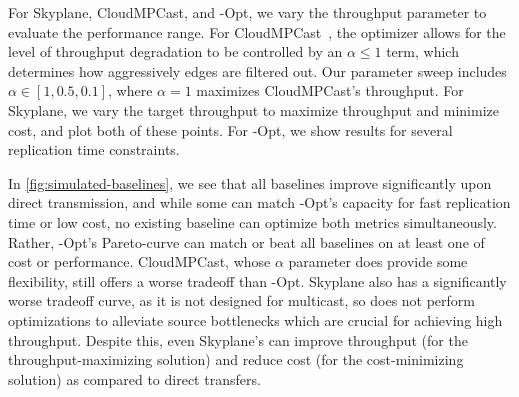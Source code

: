 For Skyplane, CloudMPCast, and \sys-Opt, we vary the throughput parameter to evaluate the performance range.  
For CloudMPCast~\cite{garcia2015cost}, the optimizer 
allows for the level of throughput degradation to be controlled by an $\alpha \le 1$ term, which determines how aggressively edges are filtered out.
Our parameter sweep includes $\alpha \in [1, 0.5, 0.1]$, where $\alpha=1$ maximizes CloudMPCast's throughput.
For Skyplane, we vary the target throughput to maximize throughput and minimize cost, and plot both of these points. 
For \sys-Opt, we show results for several replication time constraints.

In \cref{fig:simulated-baselines}, we see that all baselines improve significantly upon direct transmission, and while some can match \sys-Opt's capacity for fast replication time or low cost, no existing baseline can optimize both metrics simultaneously.
Rather, \sys-Opt's Pareto-curve can match or beat all baselines on at least one of cost or performance.
CloudMPCast, whose $\alpha$ parameter does provide some flexibility, still offers a worse tradeoff than \sys-Opt.
Skyplane also has a significantly worse tradeoff curve, as it is not designed for multicast, so does not perform optimizations to alleviate source bottlenecks which are crucial for achieving high throughput. Despite this, even Skyplane's can improve throughput (for the throughput-maximizing solution) and reduce cost (for the cost-minimizing solution) as compared to direct transfers. 




